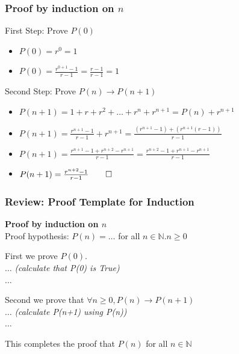 \documentclass{beamer}
\begin{document}
\begin{frame}
  \frametitle{Proof by induction on $n$}

  {\larger
    \begin{block}{First Step: Prove $P(0)$}
      \begin{itemize}
      \item $P(0) = r^0 = 1$
      \item $P(0) = \frac{r^{0+1}-1}{r-1} = \frac{r-1}{r-1} = 1$
      \end{itemize}
    \end{block}

    \begin{block}{Second Step: Prove $P(n) \rightarrow P(n+1)$}
      \begin{itemize}
      \item $P(n+1) = 1 + r + r^2 + \ldots + r^n + r^{n+1} = P(n)+r^{n+1}$
      \item $P(n+1) = \frac{r^{n+1}-1}{r-1} + r^{n+1} =
        \frac{(r^{n+1}-1) + (r^{n+1}(r-1))}{r-1}$
      \item $P(n+1) = \frac{r^{n+1} - 1 + r^{n+2} - r^{n+1}}{r-1} =
        \frac{r^{n+2} - 1 + r^{n+1} - r^{n+1}}{r-1}$
      \item $P(n+1) = \frac{r^{n+2} - 1}{r-1} \qed$
      \end{itemize}
    \end{block}
  }
\end{frame}

\begin{frame}
  \frametitle{Review: Proof Template for Induction}

  {\larger
    {\bf Proof by induction on $n$}\\
    Proof hypothesis: $P(n) = \ldots$ for all $n \in \mathbb{N}. n \geq 0$\\

    \bigskip
    
    First we prove $P(0)$.\\
    $\ldots$ \emph{(calculate that P(0) is True)}\\
    $\ldots$\\

    \bigskip

    Second we prove that $\forall n \geq 0, P(n) \rightarrow P(n+1)$\\
    $\ldots$ \emph{(calculate P(n+1) using P(n))}\\
    $\ldots$\\

    \bigskip
    
    This completes the proof that $P(n)$ for all $n\in\mathbb{N}$    
  }
\end{frame}
\end{document}
